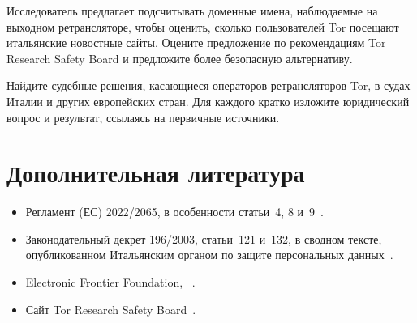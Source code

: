 \begin{esercizio}[2]\label{es:25-esperimento}
Исследователь предлагает подсчитывать доменные имена, наблюдаемые на выходном ретрансляторе, чтобы оценить, сколько пользователей Tor посещают итальянские новостные сайты. Оцените предложение по рекомендациям Tor Research Safety Board и предложите более безопасную альтернативу.
\end{esercizio}

\begin{esercizio}[3]\label{es:25-ricerca}
Найдите судебные решения, касающиеся операторов ретрансляторов Tor, в судах Италии и других европейских стран. Для каждого кратко изложите юридический вопрос и результат, ссылаясь на первичные источники.
\end{esercizio}

\section*{Дополнительная литература}
\begin{itemize}
  \item Регламент (ЕС) 2022/2065, в особенности статьи~4, 8 и~9~\cite{dsa2022}.
  \item Законодательный декрет 196/2003, статьи~121 и~132, в сводном тексте, опубликованном Итальянским органом по защите персональных данных~\cite{codiceprivacy}.
  \item Electronic Frontier Foundation, ~\cite{efflegalfaq}.
  \item Сайт Tor Research Safety Board~\cite{trsb}.
\end{itemize}
